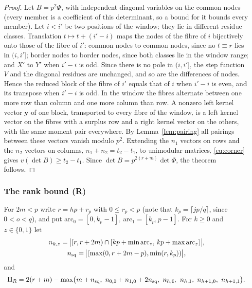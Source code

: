 \documentclass[11pt]{amsart}
\theoremstyle{definition}
\theoremstyle{remark}
\numberwithin{equation}{section}
\begin{document}
\begin{proof}
Let $B=p^2\Phi$, with independent diagonal variables on the common nodes (every member is a coefficient of this
determinant, so a bound for it bounds every member). Let $i<i'$ be two positions of the window; they lie in different
residue classes. Translation $t\mapsto t+(i'-i)$ maps the nodes of the fibre of $i$ bijectively onto those of the fibre of
$i'$: common nodes to common nodes, since no $t\equiv r$ lies in $(i,i']$; border nodes to border nodes, since both classes
lie in the window range; and $X'$ to $Y'$ when $i'-i$ is odd. Since there is no pole in $(i,i']$, the step function $V$
and the diagonal residues are unchanged, and so are the differences of nodes. Hence the reduced block of the fibre of $i'$
equals that of $i$ when $i'-i$ is even, and its transpose when $i'-i$ is odd. In the window the fibres alternate between
one more row than column and one more column than row. A nonzero left kernel vector $\mathbf y$ of one block, transported
to every fibre of the window, is a left kernel vector on the fibres with a surplus row and a right kernel vector on the
others, with the same moment pair everywhere. By Lemma~\ref{lem:pairing} all pairings between these vectors vanish
modulo $p^2$. Extending the $n_1$ vectors on rows and the $n_2$ vectors on columns, $n_1+n_2=t_2-t_1$, to unimodular
matrices, \eqref{eq:corner} gives $v(\det B)\ge t_2-t_1$. Since $\det B=p^{2(r+m)}\det\Phi$, the theorem follows.
\end{proof}

\subsubsection{The rank bound (R)}\label{sssec:rank}
For $2m<p$ write $r=hp+r_p$ with $0\le r_p<p$ (note that $k_p=\lceil jp/q\rceil$, since $0<o<q$), and put
$\mathrm{arc}_0=[0,k_p-1]$,
$\mathrm{arc}_1=[k_p,p-1]$. For $k\ge0$ and $z\in\{0,1\}$ let
\[
\begin{gathered}
 n_{k,z}=\bigl|[r,r+2m)\cap[kp+\min\mathrm{arc}_z,\,kp+\max\mathrm{arc}_z]\bigr|,\\
 n_{\rm sq}=\bigl|[\max(0,r+2m-p),\min(r,k_p))\bigr|,
\end{gathered}
\]
and
\begin{equation}\label{eq:PiR}
 \Pi_R=2(r+m)-\max\bigl(m+n_{\rm sq},\ n_{0,0}+n_{1,0}+2n_{\rm sq},\ n_{h,0},\ n_{h,1},\ n_{h+1,0},\ n_{h+1,1}\bigr).
\end{equation}
\end{document}
